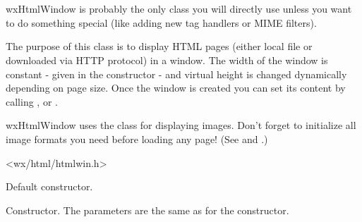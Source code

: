 %
%

\section{}\label{wxhtmlwindow}

wxHtmlWindow is probably the only class you will directly use
unless you want to do something special (like adding new tag
handlers or MIME filters).

The purpose of this class is to display HTML pages (either local
file or downloaded via HTTP protocol) in a window. The width
of the window is constant - given in the constructor - and virtual height
is changed dynamically depending on page size.
Once the window is created you can set its content by calling 
,
 or
.


wxHtmlWindow uses the  class for displaying images.
Don't forget to initialize all image formats you need before loading any page!
(See  and
.)




<wx/html/htmlwin.h>

\label{wxhtmlwindowwxhtmlwindow}


Default constructor.


Constructor. The parameters are the same as for the  constructor.



